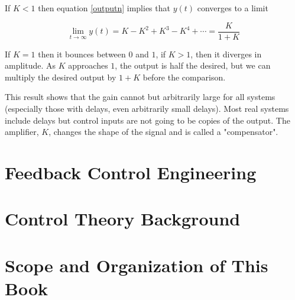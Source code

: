 \documentclass[10pt]{article}
\begin{document}
If $K < 1$ then equation \ref{outputn} implies that $y(t)$ converges to a limit

\begin{equation}
    \lim_{t \rightarrow \infty} y(t) = K - K^2 + K^3 - K^4 + \cdots = \frac{K}{1 + K}
\end{equation}

\noindent If $K = 1$ then it bounces between $0$ and $1$, if $K>1$, then it diverges in amplitude. As $K$ approaches $1$, the output is half the desired, but we can multiply the desired output by $1+K$ before the comparison.

This result shows that the gain cannot but arbitrarily large for all systems (especially those with delays, even arbitrarily small delays). Most real systems include delays but control inputs are not going to be copies of the output. The amplifier, $K$, changes the shape of the signal and is called a "compensator".

\section{Feedback Control Engineering}





\section{Control Theory Background}

\section{Scope and Organization of This Book}

\end{document}
